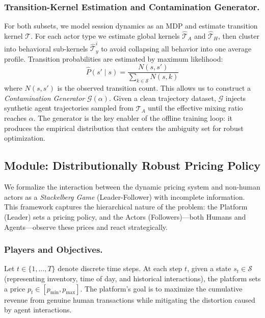 \documentclass[sigconf]{acmart}
\begin{document}
\subsubsection{Transition-Kernel Estimation and Contamination Generator.}
\label{sec:tpe}
For both subsets, we model session dynamics as an MDP and estimate transition kernel $\mathcal{T}$. For each actor type we estimate global kernels $\hat{\mathcal{T}}_A$ and $\hat{\mathcal{T}}_H$, then cluster into behavioral sub-kernels $\hat{\mathcal{T}}_y^i$ to avoid collapsing all behavior into one average profile. Transition probabilities are estimated by maximum likelihood:
\begin{equation}
    \hat{P}(s' \mid s) = \frac{N(s, s')}{\sum_{k \in \mathcal{S}} N(s, k)}
\end{equation}
where $N(s, s')$ is the observed transition count. This allows us to construct a \textit{Contamination Generator} $\mathcal{G}(\alpha)$. Given a clean trajectory dataset, $\mathcal{G}$ injects synthetic agent trajectories sampled from $\hat{\mathcal{T}}_A$ until the effective mixing ratio reaches $\alpha$. The generator is the key enabler of the offline training loop: it produces the empirical distribution that centers the ambiguity set for robust optimization.


\subsection{Module: Distributionally Robust Pricing Policy}
\label{sec:drrl}

We formalize the interaction between the dynamic pricing system and non-human actors as a \textit{Stackelberg Game} (Leader-Follower) with incomplete information. This framework captures the hierarchical nature of the problem: the Platform (Leader) sets a pricing policy, and the Actors (Followers)---both Humans and Agents---observe these prices and react strategically.

\subsubsection{Players and Objectives.}
Let $t \in \{1, \dots, T\}$ denote discrete time steps. At each step $t$, given a state $s_t \in \mathcal{S}$ (representing inventory, time of day, and historical interactions), the platform sets a price $p_t \in [p_{\min}, p_{\max}]$. The platform's goal is to maximize the cumulative revenue from genuine human transactions while mitigating the distortion caused by agent interactions.
\end{document}
